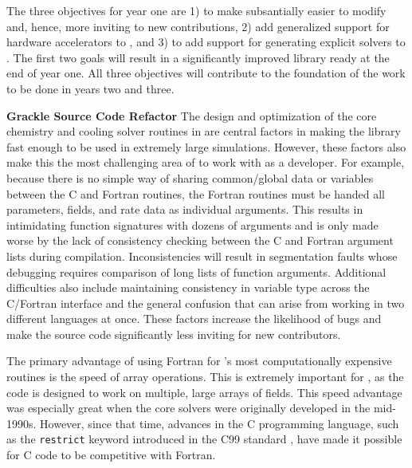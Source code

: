 The three objectives for year one are 1) to make \grackle{} subsantially
easier to modify and, hence, more inviting to new contributions, 2)
add generalized support for hardware accelerators to \grackle{}, and
3) to add support for generating explicit solvers to \dengo{}.  The
first two goals will result in a significantly improved \grackle{}
library ready at the end of year one. All three objectives will
contribute to the foundation of the work to be done in years two and
three.

\noindent \textbf{Grackle Source Code Refactor}
The design and optimization of the core chemistry and cooling solver
routines in \grackle{} are central factors in making the library fast
enough to be used in extremely large simulations.  However, these
factors also make this the most challenging area of \grackle{} to
work with as a developer.  For example, because there is no simple way
of sharing common/global data or variables between the C and Fortran
routines, the Fortran routines must be handed all parameters, fields,
and rate data as individual arguments.  This results in intimidating
function signatures with dozens of arguments and is only made worse by
the lack of consistency checking between the C and Fortran argument
lists during compilation.  Inconsistencies will result in segmentation
faults whose debugging requires comparison of long lists of function
arguments.  Additional difficulties also include maintaining
consistency in variable type across the C/Fortran interface and the
general confusion that can arise from working in two different
languages at once.  These factors increase the likelihood of bugs and
make the source code significantly less inviting for new
contributors.

The primary advantage of using Fortran for \grackle{}'s most
computationally expensive routines is the speed of array operations.
This is extremely important for \grackle{}, as the code is designed to
work on multiple, large arrays of fields.  This speed advantage was
especially great when the core solvers were originally developed in
the mid-1990s.  However, since that time, advances in the C
programming language, such as the \texttt{restrict} keyword introduced
in the C99 standard \citep{c99}, have made it possible for C code to
be competitive with Fortran.

